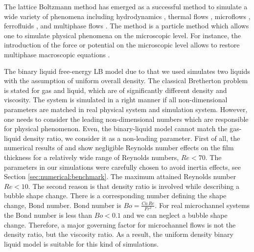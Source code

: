 \documentclass[preprint,12pt]{elsarticle}
\begin{document}
The lattice Boltzmann method has emerged as a successful method to simulate
a wide variety of phenomena including hydrodynamics \cite{yu}, thermal flows
\cite{karlin-minimalmodels}, microflows \cite{ansumali-small-knudsen},
ferrofluids \cite{kuzmin-aniso}, and multiphase flows
\cite{swift,Shan-chen:extended}. The method is a particle method which allows one to simulate physical
phenomena on the microscopic level. For instance, the introduction of the force or potential on the
microscopic level allows to restore multiphase macroscopic equations \cite{swift,
Shan-chen:extended}.

The binary liquid free-energy LB model due to \citet{swift} that we used
simulates two liquids with the assumption of uniform overall
density. %
The classical Bretherton
problem is stated for gas and liquid, which are of
significantly
different density and viscosity. {\color{red} The system is simulated in a right manner if all
non-dimensional parameters are matched in real physical system and simulation system.
However, one needs to consider the leading non-dimensional numbers which are responsible for
physical phenomenon. Even, the binary-liquid model cannot match the gas-liquid density ratio, we
consider it as a non-leading parameter. First of all, the numerical
results of
\citet{giavedoni-numerical} and \citet{heil-bretherton} show
negligible Reynolds number effects on the film thickness for a relatively wide range of Reynolds
numbers, $Re<70$. The parameters in our simulations were carefully chosen to
avoid  inertia
effects, see Section \ref{sec:numerical:benchmark}. The maximum attained
Reynolds number $Re<10$. The second reason is that density ratio is involved while describing a
bubble shape change. There is a corresponding number defining the shape change, Bond number. Bond
number is $Bo=\frac{Ca\,Re}{Fr^2}$. For real microchannel systems the Bond number is less than
$Bo<0.1$ and we can neglect a bubble shape change.}
Therefore, a major governing
factor for microchannel flows is not the density ratio, but
the
viscosity ratio. As a result, the uniform density binary liquid model is suitable for this kind of
simulations.  

\end{document}
